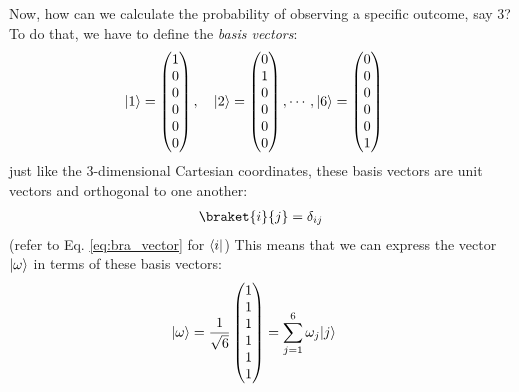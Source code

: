 Now, how can we calculate the probability of observing a specific outcome, say 3?
To do that, we have to define the \emph{basis vectors}:
\begin{align}
  \lvert1\rangle & = \begin{pmatrix}
                1 \\
                0 \\
                0 \\
                0 \\
                0 \\
                0
              \end{pmatrix}, \quad
  \lvert2\rangle = \begin{pmatrix}
              0 \\
              1 \\
              0 \\
              0 \\
              0 \\
              0
            \end{pmatrix}, \cdots,
  \lvert6\rangle = \begin{pmatrix}
              0 \\
              0 \\
              0 \\
              0 \\
              0 \\
              1
            \end{pmatrix}
\end{align}
just like the 3-dimensional Cartesian coordinates, these basis vectors are unit vectors and orthogonal to one another:
\begin{align}
  \braket{i}{j} = \delta_{ij}
\end{align}
(refer to Eq. \eqref{eq:bra_vector} for $\langle i\rvert$)
This means that we can express the vector $\lvert\omega\rangle$ in terms of these basis vectors:
\begin{align}
  \lvert\omega\rangle & = \frac{1}{\sqrt{6}} \begin{pmatrix}
                                        1 \\
                                        1 \\
                                        1 \\
                                        1 \\
                                        1 \\
                                        1
                                      \end{pmatrix} = \sum_{j=1}^{6} \omega_j \lvert j\rangle
\end{align}
